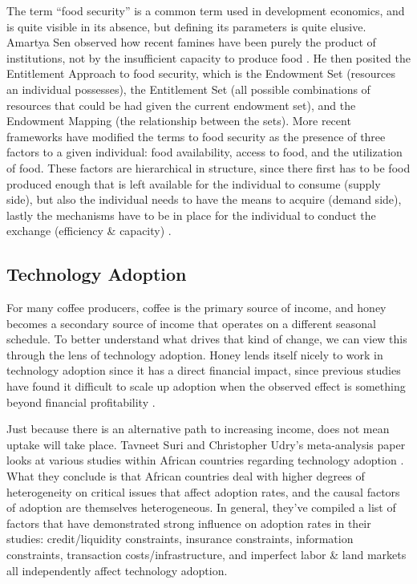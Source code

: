 \documentclass[../main.tex]{subfiles}
\begin{document}
The term “food security” is a common term used in development economics, and is quite visible in its absence, but defining its parameters is quite elusive. Amartya Sen observed how recent famines have been purely the product of institutions, not by the insufficient capacity to produce food \parencite{sen_poverty_1982}. He then posited the Entitlement Approach to food security, which is the Endowment Set (resources an individual possesses), the Entitlement Set (all possible combinations of resources that could be had given the current endowment set), and the Endowment Mapping (the relationship between the sets).  More recent frameworks have modified the terms to food security as the presence of three factors to a given individual: food availability, access to food, and the utilization of food. These factors are hierarchical in structure, since there first has to be food produced enough that is left available for the individual to consume (supply side), but also the individual needs to have the means to acquire (demand side), lastly the mechanisms have to be in place for the individual to conduct the exchange (efficiency \& capacity) \parencite{barrett_measuring_2010}. 

\subsection{Technology Adoption}

For many coffee producers, coffee is the primary source of income, and honey becomes a secondary source of income that operates on a different seasonal schedule. To better understand what drives that kind of change, we can view this through the lens of technology adoption. Honey lends itself nicely to work in technology adoption since it has a direct financial impact, since previous studies have found it difficult to scale up adoption when the observed effect is something beyond financial profitability \parencite{foster_learning_1995}.

Just because there is an alternative path to increasing income, does not mean uptake will take place. Tavneet Suri and Christopher Udry’s meta-analysis paper looks at various studies within African countries regarding technology adoption \parencite{suri_agricultural_2022}. What they conclude is that African countries deal with higher degrees of heterogeneity on critical issues that affect adoption rates, and the causal factors of adoption are themselves heterogeneous. In general, they’ve compiled a list of factors that have demonstrated strong influence on adoption rates in their studies: credit/liquidity constraints, insurance constraints, information constraints, transaction costs/infrastructure, and imperfect labor \& land markets all independently affect technology adoption.
\end{document}
